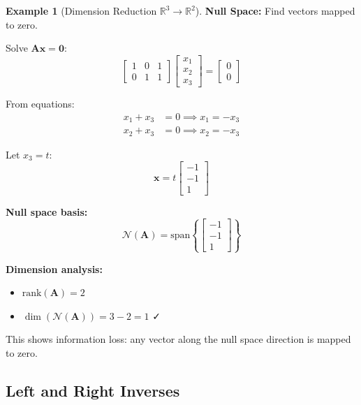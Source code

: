 \documentclass[12pt,a4paper]{article}
\theoremstyle{definition}
\newtheorem{example}{Example}[section]
\begin{document}
\begin{example}[Dimension Reduction $\mathbb{R}^3 \to \mathbb{R}^2$]
\textbf{Null Space:} Find vectors mapped to zero.

Solve $\mathbf{A}\mathbf{x} = \mathbf{0}$:
\begin{equation}
\begin{bmatrix}
1 & 0 & 1 \\
0 & 1 & 1
\end{bmatrix} \begin{bmatrix} x_1 \\ x_2 \\ x_3 \end{bmatrix} = \begin{bmatrix} 0 \\ 0 \end{bmatrix}
\end{equation}

From equations:
\begin{align}
x_1 + x_3 &= 0 \implies x_1 = -x_3 \\
x_2 + x_3 &= 0 \implies x_2 = -x_3
\end{align}

Let $x_3 = t$:
\begin{equation}
\mathbf{x} = t\begin{bmatrix} -1 \\ -1 \\ 1 \end{bmatrix}
\end{equation}

\textbf{Null space basis:}
\begin{equation}
\mathcal{N}(\mathbf{A}) = \text{span}\left\{\begin{bmatrix} -1 \\ -1 \\ 1 \end{bmatrix}\right\}
\end{equation}

\textbf{Dimension analysis:}
\begin{itemize}
    \item $\text{rank}(\mathbf{A}) = 2$
    \item $\dim(\mathcal{N}(\mathbf{A})) = 3 - 2 = 1$ ✓
\end{itemize}

This shows information loss: any vector along the null space direction is mapped to zero.
\end{example}

\subsection{Left and Right Inverses}
\end{document}
